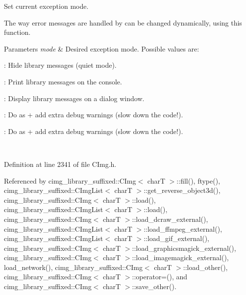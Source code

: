 Set current  exception mode. 

The way error messages are handled by  can be changed dynamically, using this function. 
\begin{DoxyParams}{Parameters}
{\em mode} & Desired exception mode. Possible values are\+:
\begin{DoxyItemize}
\item {}\+: Hide library messages (quiet mode).
\item {}\+: Print library messages on the console.
\item {}\+: Display library messages on a dialog window.
\item {}\+: Do as {} + add extra debug warnings (slow down the code!).
\item {}\+: Do as {} + add extra debug warnings (slow down the code!). 
\end{DoxyItemize}\\
\hline
\end{DoxyParams}


Definition at line 2341 of file C\+Img.\+h.



Referenced by cimg\+\_\+library\+\_\+suffixed\+::\+C\+Img$<$ char\+T $>$\+::fill(), ftype(), cimg\+\_\+library\+\_\+suffixed\+::\+C\+Img\+List$<$ char\+T $>$\+::get\+\_\+reverse\+\_\+object3d(), cimg\+\_\+library\+\_\+suffixed\+::\+C\+Img$<$ char\+T $>$\+::load(), cimg\+\_\+library\+\_\+suffixed\+::\+C\+Img\+List$<$ char\+T $>$\+::load(), cimg\+\_\+library\+\_\+suffixed\+::\+C\+Img$<$ char\+T $>$\+::load\+\_\+dcraw\+\_\+external(), cimg\+\_\+library\+\_\+suffixed\+::\+C\+Img\+List$<$ char\+T $>$\+::load\+\_\+ffmpeg\+\_\+external(), cimg\+\_\+library\+\_\+suffixed\+::\+C\+Img\+List$<$ char\+T $>$\+::load\+\_\+gif\+\_\+external(), cimg\+\_\+library\+\_\+suffixed\+::\+C\+Img$<$ char\+T $>$\+::load\+\_\+graphicsmagick\+\_\+external(), cimg\+\_\+library\+\_\+suffixed\+::\+C\+Img$<$ char\+T $>$\+::load\+\_\+imagemagick\+\_\+external(), load\+\_\+network(), cimg\+\_\+library\+\_\+suffixed\+::\+C\+Img$<$ char\+T $>$\+::load\+\_\+other(), cimg\+\_\+library\+\_\+suffixed\+::\+C\+Img$<$ char\+T $>$\+::operator=(), and cimg\+\_\+library\+\_\+suffixed\+::\+C\+Img$<$ char\+T $>$\+::save\+\_\+other().

